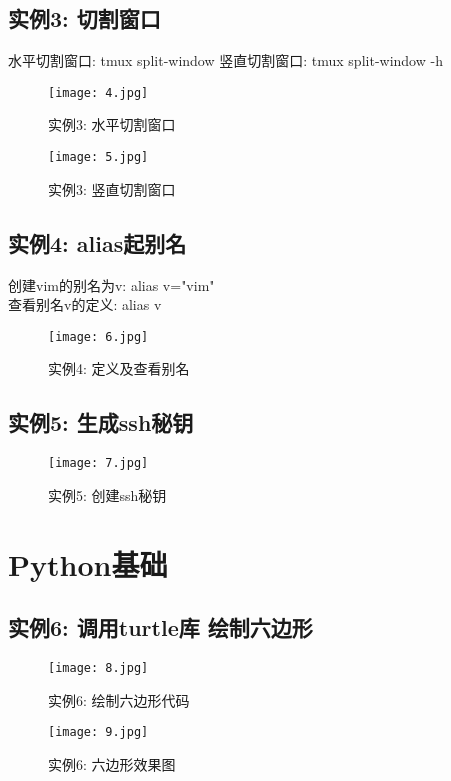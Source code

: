\documentclass[a4paper, 12pt]{article}
\begin{document}
        \subsection{实例3: 切割窗口}
        \noindent 水平切割窗口: tmux split-window
        竖直切割窗口: tmux split-window -h
        \begin{figure}[h!]
          \centering
          \texttt{[image: 4.jpg]}
          \caption{实例3: 水平切割窗口 }
        \end{figure}
        \begin{figure}[h!]
          \centering
          \texttt{[image: 5.jpg]}
          \caption{实例3: 竖直切割窗口 }
        \end{figure}
        \subsection{实例4: alias起别名}
        \noindent 创建vim的别名为v: alias v="vim"\\
        查看别名v的定义: alias v
        \begin{figure}[h!]
          \centering
          \texttt{[image: 6.jpg]}
          \caption{实例4: 定义及查看别名 }
        \end{figure}
        \subsection{实例5: 生成ssh秘钥}
        \begin{figure}[h!]
          \centering
          \texttt{[image: 7.jpg]}
          \caption{实例5: 创建ssh秘钥 }
        \end{figure}
        \newpage
        \section{Python基础}
        \subsection{实例6: 调用turtle库 绘制六边形}
        \begin{figure}[h!]
          \centering
          \texttt{[image: 8.jpg]}
          \caption{实例6: 绘制六边形代码 }
        \end{figure}
        \begin{figure}[h!]
          \centering
          \texttt{[image: 9.jpg]}
          \caption{实例6: 六边形效果图 }
        \end{figure}
        \newpage
\end{document}

